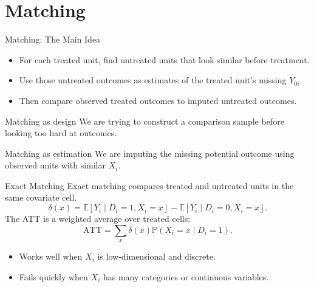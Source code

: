 \documentclass[11pt,aspectratio=169]{beamer}
\newcommand{\E}{\mathbb{E}}
\newcommand{\Prob}{\mathbb{P}}
\newcommand{\ATT}{\mathrm{ATT}}
\newcommand{\derivbutton}[1]{\vspace{0.4em}\hfill\hyperlink{app:#1}{\beamerbutton{Appendix details}}}
\begin{document}
\section{Matching}

\begin{frame}{Matching: The Main Idea}
  \begin{itemize}
    \item For each treated unit, find untreated units that look similar before treatment.
    \item Use those untreated outcomes as estimates of the treated unit's missing \(Y_{0i}\).
    \item Then compare observed treated outcomes to imputed untreated outcomes.
  \end{itemize}
  \begin{block}{Matching as design}
    We are trying to construct a comparison sample before looking too hard at outcomes.
  \end{block}
  \begin{block}{Matching as estimation}
    We are imputing the missing potential outcome using observed units with similar \(X_i\).
  \end{block}
\end{frame}

\begin{frame}{Exact Matching}
  Exact matching compares treated and untreated units in the same covariate cell.
  \[
    \delta(x)
    =
    \E[Y_i\mid D_i=1,X_i=x]
    -
    \E[Y_i\mid D_i=0,X_i=x].
  \]
  The ATT is a weighted average over treated cells:
  \[
    \ATT
    =
    \sum_x \delta(x)\Prob(X_i=x\mid D_i=1).
  \]
  \begin{itemize}
    \item Works well when \(X_i\) is low-dimensional and discrete.
    \item Fails quickly when \(X_i\) has many categories or continuous variables.
  \end{itemize}
  \derivbutton{exact-matching}
\end{frame}
\end{document}
